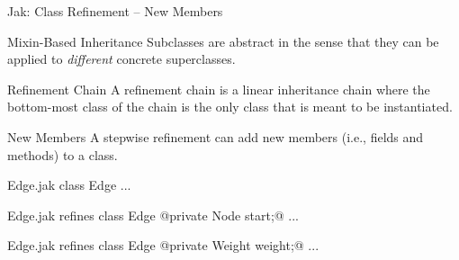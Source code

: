 \begin{frame}[fragile]{Jak: Class Refinement -- New Members} %
	\begin{fancycolumns}[animation=none]
		\begin{definition}{Mixin-Based Inheritance} %
			Subclasses are abstract in the sense that they can be applied to \emph{different} concrete superclasses.
		\end{definition}
		\begin{definition}{Refinement Chain}
			A refinement chain is a linear inheritance chain where the bottom-most class of the chain is the only class that is meant to be instantiated.
		\end{definition}
		\begin{definition}{New Members}
			A stepwise refinement can add new members (i.e., fields and methods) to a class.
		\end{definition}
	\nextcolumn
\begin{codetight}{Edge.jak}
class Edge {
	...
}
\end{codetight}
\begin{codetight}{Edge.jak}
refines class Edge {
	@private Node start;@
	...
}
\end{codetight}
\begin{codetight}{Edge.jak}
refines class Edge {
	@private Weight weight;@
	...
}
\end{codetight}
	\end{fancycolumns}
\end{frame}

